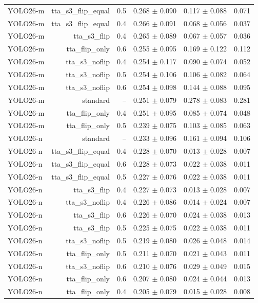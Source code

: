 \begin{table}[htbp]
{\begin{tabular}{lrrrrr}
YOLO26-m & tta\_s3\_flip\_equal & 0.5 & 0.268 $\pm$ 0.090 & 0.117 $\pm$ 0.088 & 0.071 \\
YOLO26-m & tta\_s3\_flip\_equal & 0.4 & 0.266 $\pm$ 0.091 & 0.068 $\pm$ 0.056 & 0.037 \\
YOLO26-m & tta\_s3\_flip & 0.4 & 0.265 $\pm$ 0.089 & 0.067 $\pm$ 0.057 & 0.036 \\
YOLO26-m & tta\_flip\_only & 0.6 & 0.255 $\pm$ 0.095 & 0.169 $\pm$ 0.122 & 0.112 \\
YOLO26-m & tta\_s3\_noflip & 0.4 & 0.254 $\pm$ 0.117 & 0.090 $\pm$ 0.074 & 0.052 \\
YOLO26-m & tta\_s3\_noflip & 0.5 & 0.254 $\pm$ 0.106 & 0.106 $\pm$ 0.082 & 0.064 \\
YOLO26-m & tta\_s3\_noflip & 0.6 & 0.254 $\pm$ 0.098 & 0.144 $\pm$ 0.088 & 0.095 \\
YOLO26-m & standard & -- & 0.251 $\pm$ 0.079 & 0.278 $\pm$ 0.083 & 0.281 \\
YOLO26-m & tta\_flip\_only & 0.4 & 0.251 $\pm$ 0.095 & 0.085 $\pm$ 0.074 & 0.048 \\
YOLO26-m & tta\_flip\_only & 0.5 & 0.239 $\pm$ 0.075 & 0.103 $\pm$ 0.085 & 0.063 \\
YOLO26-n & standard & -- & 0.233 $\pm$ 0.096 & 0.161 $\pm$ 0.094 & 0.106 \\
YOLO26-n & tta\_s3\_flip\_equal & 0.4 & 0.228 $\pm$ 0.070 & 0.013 $\pm$ 0.028 & 0.007 \\
YOLO26-n & tta\_s3\_flip\_equal & 0.6 & 0.228 $\pm$ 0.073 & 0.022 $\pm$ 0.038 & 0.011 \\
YOLO26-n & tta\_s3\_flip\_equal & 0.5 & 0.227 $\pm$ 0.076 & 0.022 $\pm$ 0.038 & 0.011 \\
YOLO26-n & tta\_s3\_flip & 0.4 & 0.227 $\pm$ 0.073 & 0.013 $\pm$ 0.028 & 0.007 \\
YOLO26-n & tta\_s3\_noflip & 0.4 & 0.226 $\pm$ 0.086 & 0.014 $\pm$ 0.024 & 0.007 \\
YOLO26-n & tta\_s3\_flip & 0.6 & 0.226 $\pm$ 0.070 & 0.024 $\pm$ 0.038 & 0.013 \\
YOLO26-n & tta\_s3\_flip & 0.5 & 0.225 $\pm$ 0.075 & 0.022 $\pm$ 0.038 & 0.011 \\
YOLO26-n & tta\_s3\_noflip & 0.5 & 0.219 $\pm$ 0.080 & 0.026 $\pm$ 0.048 & 0.014 \\
YOLO26-n & tta\_flip\_only & 0.5 & 0.211 $\pm$ 0.070 & 0.021 $\pm$ 0.043 & 0.011 \\
YOLO26-n & tta\_s3\_noflip & 0.6 & 0.210 $\pm$ 0.076 & 0.029 $\pm$ 0.049 & 0.015 \\
YOLO26-n & tta\_flip\_only & 0.6 & 0.207 $\pm$ 0.080 & 0.024 $\pm$ 0.044 & 0.013 \\
YOLO26-n & tta\_flip\_only & 0.4 & 0.205 $\pm$ 0.079 & 0.015 $\pm$ 0.028 & 0.008 \\
\bottomrule
\end{tabular}
}
\end{table}
